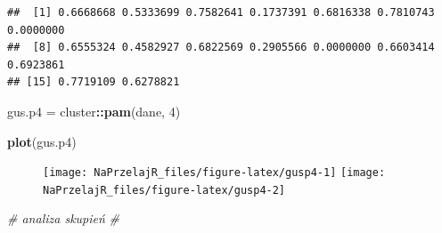 \documentclass[polish,]{book}
\newenvironment{Shaded}{\begin{snugshade}}{\end{snugshade}}
\newcommand{\CommentTok}[1]{\textcolor[rgb]{0.56,0.35,0.01}{\textit{#1}}}
\newcommand{\DataTypeTok}[1]{\textcolor[rgb]{0.13,0.29,0.53}{#1}}
\newcommand{\DecValTok}[1]{\textcolor[rgb]{0.00,0.00,0.81}{#1}}
\newcommand{\KeywordTok}[1]{\textcolor[rgb]{0.13,0.29,0.53}{\textbf{#1}}}
\newcommand{\NormalTok}[1]{#1}
\newcommand{\OperatorTok}[1]{\textcolor[rgb]{0.81,0.36,0.00}{\textbf{#1}}}
\newcommand{\StringTok}[1]{\textcolor[rgb]{0.31,0.60,0.02}{#1}}
\begin{document}
\begin{Shaded}
\end{Shaded}

\begin{verbatim}
##  [1] 0.6668668 0.5333699 0.7582641 0.1737391 0.6816338 0.7810743 0.0000000
##  [8] 0.6555324 0.4582927 0.6822569 0.2905566 0.0000000 0.6603414 0.6923861
## [15] 0.7719109 0.6278821
\end{verbatim}

\begin{Shaded}
\begin{Highlighting}[]
\NormalTok{gus.p4 =}\StringTok{ }\NormalTok{cluster}\OperatorTok{::}\KeywordTok{pam}\NormalTok{(dane, }\DecValTok{4}\NormalTok{)}
\end{Highlighting}
\end{Shaded}

\begin{Shaded}
\begin{Highlighting}[]
\KeywordTok{plot}\NormalTok{(gus.p4)}
\end{Highlighting}
\end{Shaded}

\begin{figure}[h]

{\centering \texttt{[image: NaPrzelajR\_files/figure-latex/gusp4-1]} \texttt{[image: NaPrzelajR\_files/figure-latex/gusp4-2]} 

}

\end{figure}

\begin{Shaded}
\begin{Highlighting}[]
\CommentTok{# analiza skupień}
\CommentTok{#}
\end{Highlighting}
\end{Shaded}
\end{document}
